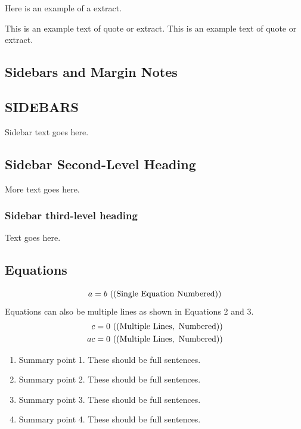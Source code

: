 \documentclass[letterpaper]{ar-1col}
\begin{document}
Here is an example of a extract.
\begin{extract}
This is an example text of quote or extract.
This is an example text of quote or extract.
\end{extract}

\subsection{Sidebars and Margin Notes}
\begin{marginnote}[]
\end{marginnote}

\begin{textbox}[h]\section{SIDEBARS}
Sidebar text goes here.
\subsection{Sidebar Second-Level Heading}
More text goes here.\subsubsection{Sidebar third-level heading}
Text goes here.\end{textbox}



\subsection{Equations}
\begin{equation}
a = b \ {\rm ((Single\ Equation\ Numbered))}
\end{equation}
Equations can also be multiple lines as shown in Equations 2 and 3.
\begin{eqnarray}
c = 0 \ {\rm ((Multiple\  Lines, \ Numbered))}\\
ac = 0 \ {\rm ((Multiple \ Lines, \ Numbered))}
\end{eqnarray}

\begin{summary}
\begin{enumerate}
\item Summary point 1. These should be full sentences.
\item Summary point 2. These should be full sentences.
\item Summary point 3. These should be full sentences.
\item Summary point 4. These should be full sentences.
\end{enumerate}
\end{summary}
\end{document}
